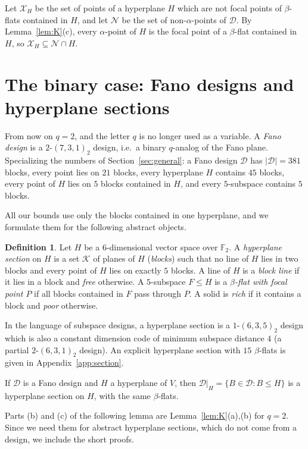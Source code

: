 \documentclass[11pt]{amsart}
\theoremstyle{definition}
\newtheorem{definition}[theorem]{Definition}
\newcommand{\F}{\mathbb{F}}
\newcommand{\D}{\mathcal{D}}
\newcommand{\K}{\mathcal{K}}
\newcommand{\X}{\mathcal{X}}
\newcommand{\N}{\mathcal{N}}
\begin{document}
Let $\X_H$ be the set of points of a hyperplane $H$ which are not focal points of $\beta$-flats contained in $H$, and let $\N$ be the set of non-$\alpha$-points of $\D$. By Lemma~\ref{lem:K}(c), every $\alpha$-point of $H$ is the focal point of a $\beta$-flat contained in $H$, so $\X_H\subseteq\N\cap H$.

\section{\texorpdfstring{The binary case: Fano designs and hyperplane sections}{The binary case: Fano designs and hyperplane sections}}\label{sec:prelim}
From now on $q=2$, and the letter $q$ is no longer used as a variable. A \emph{Fano design} is a $2$-$(7,3,1)_2$ design, i.e.\ a binary $q$-analog of the Fano plane. Specializing the numbers of Section~\ref{sec:general}: a Fano design $\D$ has $|\D|=381$ blocks, every point lies on $21$ blocks, every hyperplane $H$ contains $45$ blocks, every point of $H$ lies on $5$ blocks contained in $H$, and every $5$-subspace contains $5$ blocks.

All our bounds use only the blocks contained in one hyperplane, and we formulate them for the following abstract objects.

\begin{definition}
Let $H$ be a $6$-dimensional vector space over $\F_2$. A \emph{hyperplane section} on $H$ is a set $\K$ of planes of $H$ (\emph{blocks}) such that no line of $H$ lies in two blocks and every point of $H$ lies on exactly $5$ blocks. A line of $H$ is a \emph{block line} if it lies in a block and \emph{free} otherwise. A $5$-subspace $F\le H$ is a \emph{$\beta$-flat with focal point $P$} if all blocks contained in $F$ pass through $P$. A solid is \emph{rich} if it contains a block and \emph{poor} otherwise.
\end{definition}

In the language of subspace designs, a hyperplane section is a $1$-$(6,3,5)_2$ design which is also a constant dimension code of minimum subspace distance $4$ \textup{(}a partial $2$-$(6,3,1)_2$ design\textup{)}. An explicit hyperplane section with $15$ $\beta$-flats is given in Appendix~\ref{app:section}.

If $\D$ is a Fano design and $H$ a hyperplane of $V$, then $\D|_H=\{B\in\D: B\le H\}$ is a hyperplane section on $H$, with the same $\beta$-flats.

Parts (b) and (c) of the following lemma are Lemma~\ref{lem:K}(a),(b) for $q=2$. Since we need them for abstract hyperplane sections, which do not come from a design, we include the short proofs.
\end{document}
